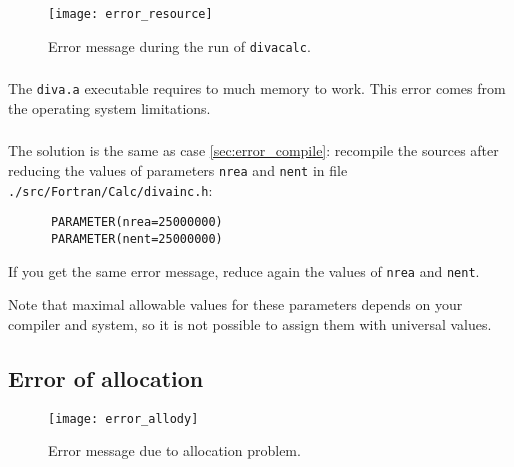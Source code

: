 \begin{figure}[htpb]
\centering
\texttt{[image: error\_resource]}
\caption{Error message during the run of \texttt{divacalc}\label{fig:error_resource}.}
\end{figure}

\subsubsection{\question}

The \texttt{diva.a} executable requires to much memory to work. This error comes from the operating system limitations.


\subsubsection{\answer}

The solution is the same as case \ref{sec:error_compile}: recompile the sources after reducing the values of parameters \texttt{nrea} and \texttt{nent} in file \texttt{./src/Fortran/Calc/divainc.h}:
\begin{verbatim}
      PARAMETER(nrea=25000000)
      PARAMETER(nent=25000000)
\end{verbatim}
If you get the same error message, reduce again the values of \texttt{nrea} and \texttt{nent}.

Note that maximal allowable values for these parameters depends on your compiler and system, so it is not possible to assign them with universal values.



\subsection{Error of allocation \label{sec:error_allocation}}

\begin{figure}[htpb]
\centering
\texttt{[image: error\_allody]}
\caption{Error message due to allocation problem.\label{fig:error_allocation}}
\end{figure}

\subsubsection{\question}

